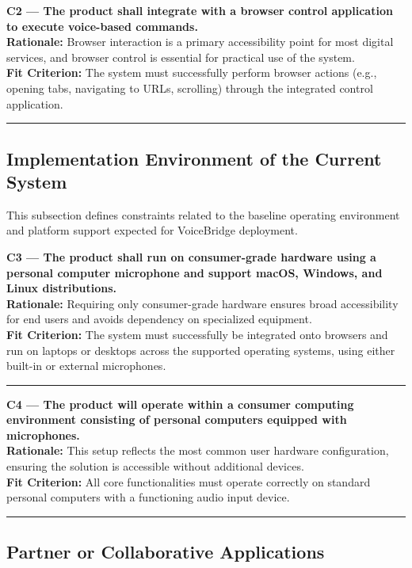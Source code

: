 \documentclass[11pt]{article}
\begin{document}
\noindent\textbf{C2 — The product shall integrate with a browser control application to execute voice-based commands.}\\
\textbf{Rationale:} Browser interaction is a primary accessibility point for most digital services, and browser control is essential for practical use of the system.\\
\textbf{Fit Criterion:} The system must successfully perform browser actions (e.g., opening tabs, navigating to URLs, scrolling) through the integrated control application.
\par\noindent\rule{\textwidth}{0.4pt}


\subsection{Implementation Environment of the Current System}
This subsection defines constraints related to the baseline operating environment and platform support expected for VoiceBridge deployment.

\noindent\textbf{C3 — The product shall run on consumer-grade hardware using a personal computer microphone and support macOS, Windows, and Linux distributions.}\\
\textbf{Rationale:} Requiring only consumer-grade hardware ensures broad accessibility for end users and avoids dependency on specialized equipment.\\
\textbf{Fit Criterion:} The system must successfully be integrated onto browsers and run on laptops or desktops across the supported operating systems, using either built-in or external microphones.
\par\noindent\rule{\textwidth}{0.4pt}

\noindent\textbf{C4 — The product will operate within a consumer computing environment consisting of personal computers equipped with microphones.}\\
\textbf{Rationale:} This setup reflects the most common user hardware configuration, ensuring the solution is accessible without additional devices.\\
\textbf{Fit Criterion:} All core functionalities must operate correctly on standard personal computers with a functioning audio input device.
\par\noindent\rule{\textwidth}{0.4pt}


\subsection{Partner or Collaborative Applications}
\end{document}
